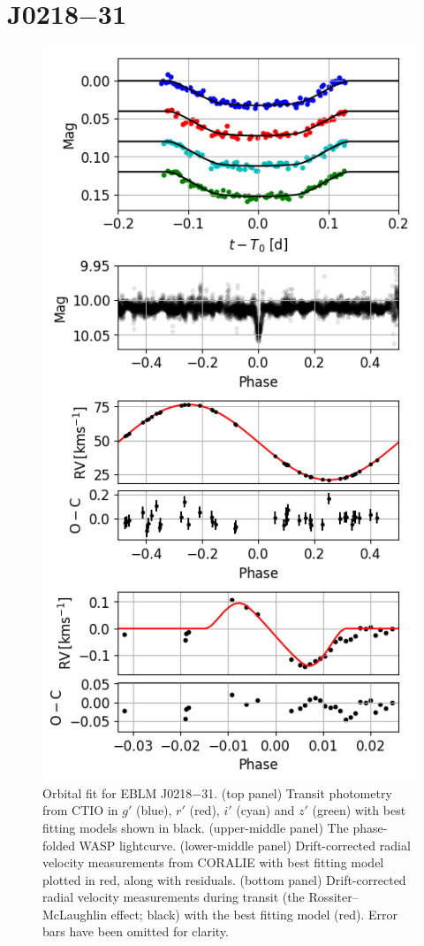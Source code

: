 \section{J0218$-$31}

\begin{figure}[htb]
  \centering
  \includegraphics[scale=0.8]{8-Results/J0218-31/orbital.png}
  \caption{Orbital fit for EBLM J0218$-$31. (top panel) Transit photometry from CTIO in $g'$ (blue), $r'$ (red), $i'$ (cyan) and $z'$ (green) with best fitting models shown in black. (upper-middle panel) The phase-folded WASP lightcurve. (lower-middle panel) Drift-corrected radial velocity measurements from CORALIE with best fitting model plotted in red, along with residuals. (bottom panel) Drift-corrected radial velocity measurements during transit (the Rossiter–McLaughlin effect; black) with the best fitting model (red). Error bars have been omitted for clarity.}
  \label{fig:J0218-31:orbit}
\end{figure}


